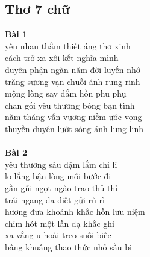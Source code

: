 \documentclass[a4paper]{article}
\theoremstyle{definition}
\begin{document}
\subsection{Thơ 7 chữ}
\textbf{Bài 1}\\
yêu nhau thắm thiết áng thơ xinh \\
 cách trở xa xôi kết nghĩa mình \\
 duyên phận ngàn năm đời luyến nhớ \\
 trăng sương vạn chuỗi ánh rung rinh \\
 mộng lòng say đắm hồn phu phụ \\
 chăn gối yêu thương bóng bạn tình \\
 năm tháng vấn vương niềm ước vọng \\
 thuyền duyên lướt sóng ánh lung linh\\
 \\
\textbf{Bài 2}\\
 yêu thương sâu đậm lắm chi li \\
 lo lắng bận lòng mỗi bước đi \\
 gần gũi ngọt ngào trao thủ thỉ \\
 trái ngang da diết gửi rù rì \\
 hương đưa khoảnh khắc hồn lưu niệm \\
 chim hót một lần dạ khắc ghi \\
 xa vắng u hoài treo suối biếc \\
 bâng khuâng thao thức nhỏ sầu bi\\
\end{document}
